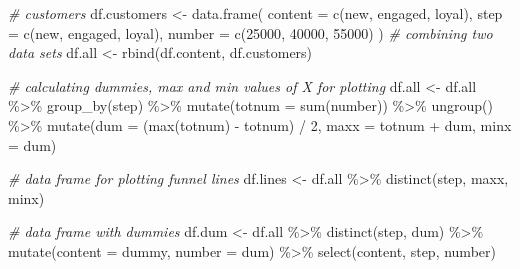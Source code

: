 \documentclass[
]{book}
\newenvironment{Shaded}{\begin{snugshade}}{\end{snugshade}}
\newcommand{\AttributeTok}[1]{\textcolor[rgb]{0.77,0.63,0.00}{#1}}
\newcommand{\CommentTok}[1]{\textcolor[rgb]{0.56,0.35,0.01}{\textit{#1}}}
\newcommand{\DecValTok}[1]{\textcolor[rgb]{0.00,0.00,0.81}{#1}}
\newcommand{\FunctionTok}[1]{\textcolor[rgb]{0.00,0.00,0.00}{#1}}
\newcommand{\NormalTok}[1]{#1}
\newcommand{\OtherTok}[1]{\textcolor[rgb]{0.56,0.35,0.01}{#1}}
\newcommand{\SpecialCharTok}[1]{\textcolor[rgb]{0.00,0.00,0.00}{#1}}
\newcommand{\StringTok}[1]{\textcolor[rgb]{0.31,0.60,0.02}{#1}}
\begin{document}
\begin{Shaded}
\begin{Highlighting}[]
\CommentTok{\# customers}
\NormalTok{df.customers }\OtherTok{\textless{}{-}} \FunctionTok{data.frame}\NormalTok{(}
    \AttributeTok{content =} \FunctionTok{c}\NormalTok{(}\StringTok{\textquotesingle{}new\textquotesingle{}}\NormalTok{, }\StringTok{\textquotesingle{}engaged\textquotesingle{}}\NormalTok{, }\StringTok{\textquotesingle{}loyal\textquotesingle{}}\NormalTok{),}
    \AttributeTok{step =} \FunctionTok{c}\NormalTok{(}\StringTok{\textquotesingle{}new\textquotesingle{}}\NormalTok{, }\StringTok{\textquotesingle{}engaged\textquotesingle{}}\NormalTok{, }\StringTok{\textquotesingle{}loyal\textquotesingle{}}\NormalTok{),}
    \AttributeTok{number =} \FunctionTok{c}\NormalTok{(}\DecValTok{25000}\NormalTok{, }\DecValTok{40000}\NormalTok{, }\DecValTok{55000}\NormalTok{)}
\NormalTok{)}
\CommentTok{\# combining two data sets}
\NormalTok{df.all }\OtherTok{\textless{}{-}} \FunctionTok{rbind}\NormalTok{(df.content, df.customers)}

\CommentTok{\# calculating dummies, max and min values of X for plotting}
\NormalTok{df.all }\OtherTok{\textless{}{-}}\NormalTok{ df.all }\SpecialCharTok{\%\textgreater{}\%}
    \FunctionTok{group\_by}\NormalTok{(step) }\SpecialCharTok{\%\textgreater{}\%}
    \FunctionTok{mutate}\NormalTok{(}\AttributeTok{totnum =} \FunctionTok{sum}\NormalTok{(number)) }\SpecialCharTok{\%\textgreater{}\%}
    \FunctionTok{ungroup}\NormalTok{() }\SpecialCharTok{\%\textgreater{}\%}
    \FunctionTok{mutate}\NormalTok{(}\AttributeTok{dum =}\NormalTok{ (}\FunctionTok{max}\NormalTok{(totnum) }\SpecialCharTok{{-}}\NormalTok{ totnum) }\SpecialCharTok{/} \DecValTok{2}\NormalTok{,}
           \AttributeTok{maxx =}\NormalTok{ totnum }\SpecialCharTok{+}\NormalTok{ dum,}
           \AttributeTok{minx =}\NormalTok{ dum)}

\CommentTok{\# data frame for plotting funnel lines}
\NormalTok{df.lines }\OtherTok{\textless{}{-}}\NormalTok{ df.all }\SpecialCharTok{\%\textgreater{}\%}
    \FunctionTok{distinct}\NormalTok{(step, maxx, minx)}

\CommentTok{\# data frame with dummies}
\NormalTok{df.dum }\OtherTok{\textless{}{-}}\NormalTok{ df.all }\SpecialCharTok{\%\textgreater{}\%}
    \FunctionTok{distinct}\NormalTok{(step, dum) }\SpecialCharTok{\%\textgreater{}\%}
    \FunctionTok{mutate}\NormalTok{(}\AttributeTok{content =} \StringTok{\textquotesingle{}dummy\textquotesingle{}}\NormalTok{,}
           \AttributeTok{number =}\NormalTok{ dum) }\SpecialCharTok{\%\textgreater{}\%}
    \FunctionTok{select}\NormalTok{(content, step, number)}


\end{Highlighting}
\end{Shaded}
\end{document}
